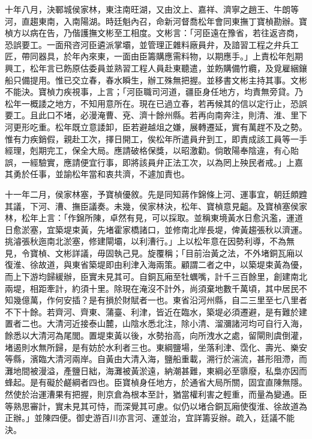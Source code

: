 \begin{pinyinscope}
十年八月，決鄆城侯家林，東注南旺湖，又由汶上、嘉祥、濟寧之趙王、牛朗等河，直趨東南，入南陽湖。時廷魁內召，命新河督喬松年會同東撫丁寶楨勘辦。寶楨方以病在告，乃偕護撫文彬至工相度。文彬言：「河臣遠在豫省，若往返咨商，恐誤要工。一面飛咨河臣遴派掌壩，並管理正雜料廠員弁，及諳習工程之弁兵工匠，帶同器具，於年內來東，一面由臣籌購應需料物，以期應手。」上責松年剋期興工，松年言已飭原估委員並熟習工程人員赴東聽遣，並飭購備竹纜，及覓雇綑鑲船只備提用。惟已交立春，春水瞬生，辦工殊無把握。並移書文彬主持其事。文彬不能決。寶楨力疾視事，上言；「河臣職司河道，疆臣身任地方，均責無旁貸。乃松年一概諉之地方，不知用意所在。現在已過立春，若再候其的信以定行止，恐誤要工。且此口不堵，必漫淹曹、兗、濟十餘州縣。若再向南奔注，則清、淮、里下河更形吃重。松年既立意諉卸，臣若避越俎之嫌，展轉遷延，實有萬趕不及之勢。惟有力疾銷假，親赴工次，擇日開工，俟松年所遣員弁到工，即責成該工員等一手經理，剋期完工，保全大局。應請破格保獎，以昭激勸。倘敢陽奉陰違，有心貽誤，一經驗實，應請便宜行事，即將該員弁正法工次，以為罔上殃民者戒。」上嘉其勇於任事，並諭松年當和衷共濟，不遽加責也。

十一年二月，侯家林塞，予寶楨優敘。先是同知蔣作錦條上河、運事宜，朝廷頗韙其議，下河、漕、撫臣議奏。未幾，侯家林決，松年、寶楨意見齟。及寶楨塞侯家林，松年上言：「作錦所陳，卓然有見，可以採取。並稱東境黃水日愈汎濫，運道日愈淤塞，宜築堤束黃，先堵霍家橋諸口，並修南北岸長堤，俾黃趨張秋以濟運。挑濬張秋迤南北淤塞，修建閘壩，以利漕行。」上以松年意在因勢利導，不為無見，令寶楨、文彬詳議，毋固執己見。旋覆稱；「目前治黃之法，不外堵銅瓦廂以復淮、徐故道，與東省築堤即由利津入海兩策。顧謂二者之中，以築堤束黃為優，而上下游均歸緩辦，臣實未見其可。自銅瓦廂至牡蠣嘴，計千三百餘里，創建南北兩堤，相距牽計，約須十里。除現在淹沒不計外，尚須棄地數千萬頃，其中居民不知幾億萬，作何安插？是有損於財賦者一也。東省沿河州縣，自二三里至七八里者不下十餘。若齊河、齊東、蒲臺、利津，皆近在臨水，築堤必須遷避，是有難於建置者二也。大清河近接泰山麓，山陰水悉北注，除小清、溜瀰諸河均可自行入海，餘悉以大清河為尾閭。置堤束黃以後，水勢抬高，向所洩水之處，留閘則虞倒灌，堵遏則水無所歸，是有妨於水利者三也。東綱鹽場，坐落利津、霑化、壽光、樂安等縣，濱臨大清河兩岸。自黃由大清入海，鹽船重載，溯行於湍流，甚形阻滯，而灘地間被漫溢，產鹽日絀，海灘被黃淤遠，納潮甚難，東綱必至隳廢，私梟亦因而蜂起。是有礙於鹺綱者四也。臣寶楨身任地方，於通省大局所關，固宜直陳無隱。然使於治運漕果有把握，則京倉為根本至計，猶當權利害之輕重，而量為變通。臣等熟思審計，實未見其可恃，而深覺其可慮。似仍以堵合銅瓦廂使復淮、徐故道為正辦。」並陳四便。御史游百川亦言河、運並治，宜詳籌妥辦。疏入，廷議不能決。


\end{pinyinscope}
